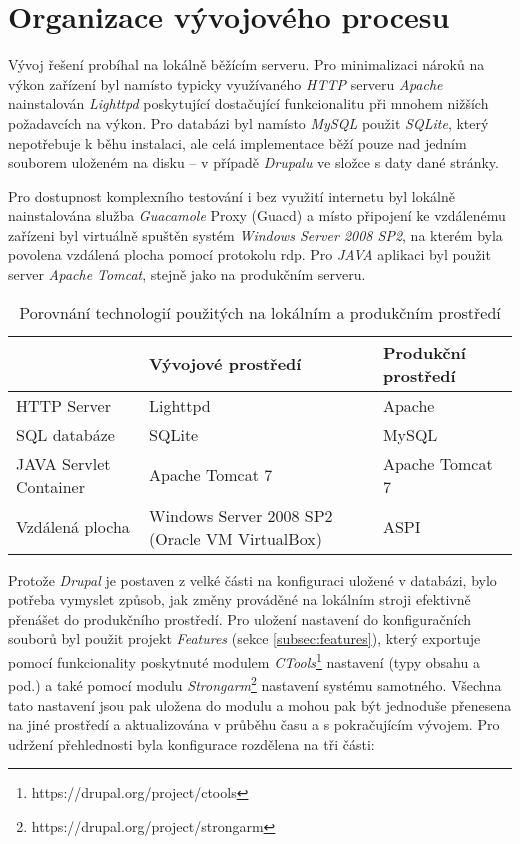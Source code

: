 \chapter{Organizace vývojového procesu}
\label{chap:vyvoj}

Vývoj řešení probíhal na lokálně běžícím serveru. Pro minimalizaci nároků na výkon zařízení byl namísto typicky využívaného \emph{HTTP} serveru \emph{Apache} nainstalován \emph{Lighttpd} poskytující dostačující funkcionalitu při mnohem nižších požadavcích na výkon. Pro databázi byl namísto \emph{MySQL} použit \emph{SQLite}, který nepotřebuje k běhu instalaci, ale celá implementace běží pouze nad jedním souborem uloženém na disku – v případě \emph{Drupalu} ve složce s daty dané stránky. 

Pro dostupnost komplexního testování i bez využití internetu byl lokálně nainstalována služba \emph{Guacamole} Proxy (Guacd) a místo připojení ke vzdálenému zařízeni byl virtuálně spuštěn systém \emph{Windows Server 2008 SP2}, na kterém byla povolena vzdálená plocha pomocí protokolu \gls{rdp}. Pro \emph{JAVA} aplikaci byl použit server \emph{Apache Tomcat}, stejně jako na produkčním serveru.

\begin{table}
  \caption{Porovnání technologií použitých na lokálním a produkčním prostředí}
  \begin{tabular}{ | p{3cm} | p{4cm} | p{4cm} | }
    \hline  
    & Vývojové prostředí & Produkční prostředí \\ \hline
    HTTP Server & Lighttpd & Apache \\ \hline
    SQL databáze & SQLite & MySQL \\ \hline
    JAVA Servlet Container & Apache Tomcat 7 & Apache Tomcat 7 \\ \hline
    Vzdálená plocha & Windows Server 2008 SP2 (Oracle VM VirtualBox) & ASPI \\ \hline
  \end{tabular}
\end{table}

Protože \emph{Drupal} je postaven z velké části na konfiguraci uložené v databázi, bylo potřeba vymyslet způsob, jak změny prováděné na lokálním stroji efektivně přenášet do produkčního prostředí. Pro uložení nastavení do konfiguračních souborů byl použit projekt \emph{Features} (sekce \ref{subsec:features}), který exportuje pomocí funkcionality poskytnuté modulem \emph{CTools}\footnote{https://drupal.org/project/ctools} nastavení (typy obsahu a pod.) a také pomocí modulu \emph{Strongarm}\footnote{https://drupal.org/project/strongarm} nastavení systému samotného. Všechna tato nastavení jsou pak uložena do modulu a mohou pak být jednoduše přenesena na jiné prostředí a aktualizována v průběhu času a s pokračujícím vývojem. Pro udržení přehlednosti byla konfigurace rozdělena na tři části:

